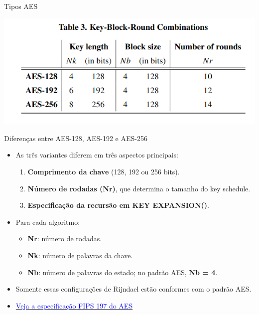 \begin{frame}{Tipos AES}


\centering
    \includegraphics[width=0.9\linewidth]{Figuras/tipos-aes.png}
    
\end{frame}

\begin{frame}{Diferenças entre AES-128, AES-192 e AES-256}
    \begin{itemize}
        \item As três variantes diferem em três aspectos principais:
        \begin{enumerate}
            \item \textbf{Comprimento da chave} (128, 192 ou 256 bits).
            \item \textbf{Número de rodadas (Nr)}, que determina o tamanho do key schedule.
            \item \textbf{Especificação da recursão em KEY EXPANSION()}.
        \end{enumerate}
        \item Para cada algoritmo:
        \begin{itemize}
            \item \textbf{Nr}: número de rodadas.
            \item \textbf{Nk}: número de palavras da chave.
            \item \textbf{Nb}: número de palavras do estado; no padrão AES, \textbf{Nb = 4}.
        \end{itemize}
        \item Somente essas configurações de Rijndael estão conformes com o padrão AES.

        \item  \href{https://csrc.nist.gov/pubs/fips/197/final}{\textcolor{blue}{Veja a especificação FIPS 197 do AES}}
    \end{itemize}

   
\end{frame}

